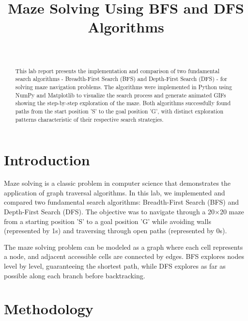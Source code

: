 \documentclass[a4paper, journal]{IEEEtran}
\begin{document}
\title{Maze Solving Using BFS and DFS Algorithms}
\author{
     \\
    }

\maketitle




\begin{abstract}
    This lab report presents the implementation and comparison of two fundamental search algorithms - Breadth-First Search (BFS) and Depth-First Search (DFS) - for solving maze navigation problems. The algorithms were implemented in Python using NumPy and Matplotlib to visualize the search process and generate animated GIFs showing the step-by-step exploration of the maze. Both algorithms successfully found paths from the start position 'S' to the goal position 'G', with distinct exploration patterns characteristic of their respective search strategies.
\end{abstract}

\section{Introduction}
Maze solving is a classic problem in computer science that demonstrates the application of graph traversal algorithms. In this lab, we implemented and compared two fundamental search algorithms: Breadth-First Search (BFS) and Depth-First Search (DFS). The objective was to navigate through a 20×20 maze from a starting position 'S' to a goal position 'G' while avoiding walls (represented by 1s) and traversing through open paths (represented by 0s).

The maze solving problem can be modeled as a graph where each cell represents a node, and adjacent accessible cells are connected by edges. BFS explores nodes level by level, guaranteeing the shortest path, while DFS explores as far as possible along each branch before backtracking.

\section{Methodology}
\end{document}
